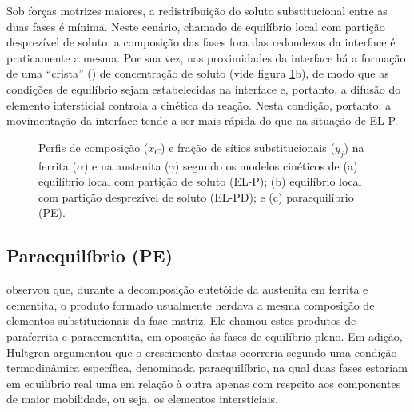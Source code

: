 Sob forças motrizes maiores, a redistribuição do soluto substitucional entre as duas fases é mínima. Neste cenário, chamado de equilíbrio local com partição desprezível de soluto, a composição das fases fora das redondezas da interface é praticamente a mesma. Por sua vez, nas proximidades da interface há a formação de uma ``crista'' () de concentração de soluto (vide figura \ref{fig:modcineticos}b), de modo que as condições de equilíbrio sejam estabelecidas na interface e, portanto, a difusão do elemento intersticial controla a cinética da reação. Nesta condição, portanto, a movimentação da interface tende a ser mais rápida do que na situação de EL-P. %

\begin{figure}
	\hspace{1.5cm}
	\vspace{0pt}
	\caption{Perfis de composição ($x_C$) e fração de sítios substitucionais ($y_j$) na ferrita ($\alpha$) e na austenita ($\gamma$) segundo os modelos cinéticos de (a) equilíbrio local com partição de soluto (EL-P); (b) equilíbrio local com partição desprezível de soluto (EL-PD); e (c) paraequilíbrio (PE).}
	\label{fig:modcineticos}
\end{figure}

\subsection{Paraequilíbrio (PE)}


 observou que, durante a decomposição eutetóide da austenita em ferrita e cementita, o produto formado usualmente herdava a mesma composição de elementos substitucionais da fase matriz. Ele chamou estes produtos de paraferrita e paracementita, em oposição às fases de equilíbrio pleno. Em adição, Hultgren argumentou que o crescimento destas  ocorreria segundo uma condição termodinâmica específica, denominada paraequilíbrio, na qual duas fases estariam em equilíbrio real uma em relação à outra apenas com respeito aos componentes de maior mobilidade, ou seja, os elementos intersticiais.


